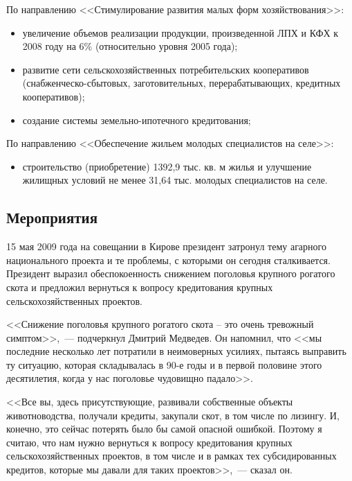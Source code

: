 \documentclass[article, 12pt, russian, oneside]{ncc}
\begin{document}
По направлению <<Стимулирование развития малых форм хозяйствования>>:

\begin{itemize}
\item увеличение объемов реализации продукции, произведенной ЛПХ и КФХ
  к 2008 году на 6\% (относительно уровня 2005 года);
\item развитие сети сельскохозяйственных потребительских кооперативов \linebreak
  (снаб\-жен\-чес\-ко-сбытовых, заготовительных, перерабатывающих, кредитных
  кооперативов);
\item создание системы земельно-ипотечного кредитования;
\end{itemize}

По направлению <<Обеспечение жильем молодых специалистов на селе>>:

\begin{itemize}
\item строительство (приобретение) 1392,9 тыс. кв. м жилья и улучшение
  жилищных условий не менее 31,64 тыс. молодых специалистов на селе.
\end{itemize}


\subsection{Мероприятия}

15 мая 2009 года на совещании в Кирове президент затронул тему агарного
национального проекта и те проблемы, с которыми он сегодня
сталкивается. Президент выразил обеспокоенность снижением поголовья
крупного рогатого скота и предложил вернуться к вопросу кредитования
крупных сельскохозяйственных проектов.

<<Снижение поголовья крупного рогатого скота – это очень тревожный
симптом>>,~--- подчеркнул Дмитрий Медведев. Он напомнил, что <<мы
последние несколько лет потратили в неимоверных усилиях, пытаясь
выправить ту ситуацию, которая складывалась в 90-е годы и в первой
половине этого десятилетия, когда у нас поголовье чудовищно падало>>.

<<Все вы, здесь присутствующие, развивали собственные объекты
животноводства, получали кредиты, закупали скот, в том числе по
лизингу. И, конечно, это сейчас потерять было бы самой опасной
ошибкой. Поэтому я считаю, что нам нужно вернуться к вопросу
кредитования крупных сельскохозяйственных проектов, в том числе и в
рамках тех субсидированных кредитов, которые мы давали для таких
проектов>>,~--- сказал он.
\end{document}
